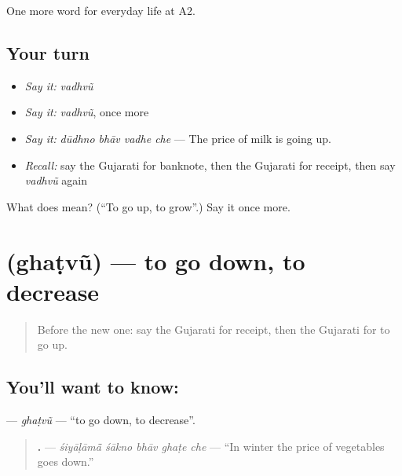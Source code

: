 \begin{grammarlens}[title={What you've built}]
One more word for everyday life at A2.
\end{grammarlens}

\subsection*{Your turn}
\begin{itemize}
\raggedright
  \item \emph{Say it:} \emph{vadhvũ}
  \item \emph{Say it:} \emph{vadhvũ}, once more
  \item \emph{Say it:} \emph{dūdhno bhāv vadhe che} — The price of milk is going up.
  \item \emph{Recall:} say the Gujarati for banknote, then the Gujarati for receipt, then say \emph{vadhvũ} again
\end{itemize}

\begin{tcolorbox}[breakable,colback=teal!4,colframe=teal!35!black,title={Before you move on}]
What does  mean? (\textquotedblleft{}To go up, to grow\textquotedblright{}.) Say it once more.
\end{tcolorbox}
\section[\texorpdfstring{\gu{ઘટવું} (ghaṭvũ)}{ઘટવું (ghaṭvũ)}]{ (ghaṭvũ) — to go down, to decrease}

\label{lesson:GU-C187-ghatvu}



\begin{quote}
Before the new one: say the Gujarati for receipt, then the Gujarati for to go up.
\end{quote}

\subsection*{You'll want to know: }
\textbf{} — \emph{ghaṭvũ} — \textquotedblleft{}to go down, to decrease\textquotedblright{}.

\begin{quote}
\textbf{    .} — \emph{śiyāḷāmā̃ śākno bhāv ghaṭe che} — \textquotedblleft{}In winter the price of vegetables goes down.\textquotedblright{}
\end{quote}

